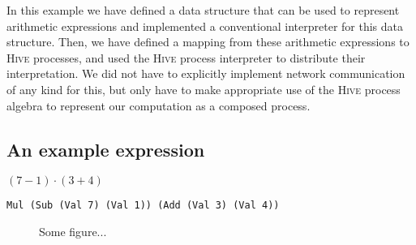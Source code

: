 In this example we have defined a data structure that can be used to represent arithmetic expressions and implemented a conventional interpreter for this data structure. Then, we have defined a mapping from these arithmetic expressions to \textsc{Hive} processes, and used the \textsc{Hive} process interpreter to distribute their interpretation. We did not have to explicitly implement network communication of any kind for this, but only have to make appropriate use of the \textsc{Hive} process algebra to represent our computation as a composed process. 

\subsection*{An example expression}
$\left(7-1\right)\cdot\left(3+4\right)$

\texttt{Mul (Sub (Val 7) (Val 1)) (Add (Val 3) (Val 4))}

\begin{figure}
  \centering
  
  \label{fig:example_expression}
  \caption{Some figure...}
\end{figure}